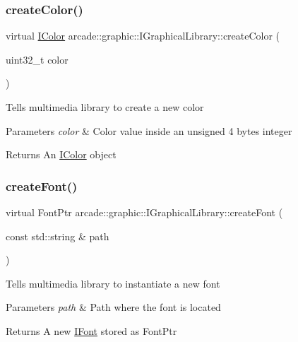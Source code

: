 \subsubsection{\texorpdfstring{createColor()}{createColor()}\hspace{0.1cm}{\footnotesize\ttfamily [2/2]}}
{\footnotesize\ttfamily virtual \mbox{\hyperlink{classarcade_1_1graphic_1_1_i_color}{I\+Color}} arcade\+::graphic\+::\+I\+Graphical\+Library\+::create\+Color (\begin{DoxyParamCaption}\item[{uint32\+\_\+t}]{color }\end{DoxyParamCaption})\hspace{0.3cm}{\ttfamily [pure virtual]}}

Tells multimedia library to create a new color 
\begin{DoxyParams}{Parameters}
{\em color} & Color value inside an unsigned 4 bytes integer \\
\hline
\end{DoxyParams}
\begin{DoxyReturn}{Returns}
An \mbox{\hyperlink{classarcade_1_1graphic_1_1_i_color}{I\+Color}} object 
\end{DoxyReturn}
\mbox{\label{classarcade_1_1graphic_1_1_i_graphical_library_a30565d5cc8678c38aa7dc447b9144242}} 
\subsubsection{\texorpdfstring{createFont()}{createFont()}}
{\footnotesize\ttfamily virtual Font\+Ptr arcade\+::graphic\+::\+I\+Graphical\+Library\+::create\+Font (\begin{DoxyParamCaption}\item[{const std\+::string \&}]{path }\end{DoxyParamCaption})\hspace{0.3cm}{\ttfamily [pure virtual]}}

Tells multimedia library to instantiate a new font 
\begin{DoxyParams}{Parameters}
{\em path} & Path where the font is located \\
\hline
\end{DoxyParams}
\begin{DoxyReturn}{Returns}
A new \mbox{\hyperlink{classarcade_1_1graphic_1_1_i_font}{I\+Font}} stored as Font\+Ptr 
\end{DoxyReturn}
\mbox{\label{classarcade_1_1graphic_1_1_i_graphical_library_acb195feccab5c859a468a852e5882b09}} 
